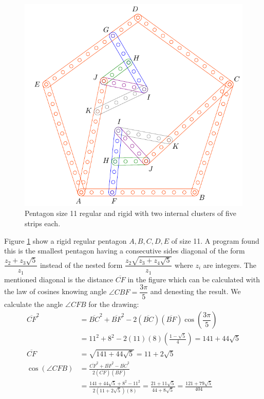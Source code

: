 \documentclass[11pt]{article}
\begin{document}
\begin{figure}[h]
 \centering
 \includegraphics[scale=1]{11/penta11a}
 \caption{Pentagon size 11 regular and rigid with two internal clusters of five strips each.}
 \label{fig:penta11a}
\end{figure}

Figure \ref{fig:penta11a} show a rigid regular pentagon $A,B,C,D,E$ of size 11. A program found this is the smallest pentagon having a consecutive sides diagonal of the form $\dfrac{z_2 + z_3\sqrt5}{z_1}$ instead of the nested form $\dfrac{z_2\sqrt{z_3+z_4\sqrt5}}{z_1}$ where $z_i$ are integers. The mentioned diagonal is the distance $\overline{CF}$ in the figure which can be calculated with the law of cosines knowing angle $\angle{CBF} = \dfrac{3\pi}5$ and denesting the result. We calculate the angle $\angle{CFB}$ for the drawing:
\begin{align}
\overline{CF}^2 &= \overline{BC}^2 + \overline{BF}^2 
 - 2(\overline{BC})(\overline{BF})\cos\left(\dfrac{3\pi}5\right)\\
 &= 11^2 + 8^2 - 2(11)(8)\left(\frac{1-\sqrt5}4\right) = 141 + 44\sqrt5\nonumber\\
\overline{CF} &= \sqrt{141 + 44\sqrt5} = 11 + 2\sqrt5\\
\cos(\angle{CFB}) &= \frac{\overline{CF}^2 + \overline{BF}^2 - \overline{BC}^2}
 {2(\overline{CF})(\overline{BF})}\nonumber\\
 &= \frac{141+44\sqrt5 + 8^2 - 11^2}{2(11+2\sqrt5)(8)}
  = \frac{21+11\sqrt5}{44+8\sqrt5} = \frac{121+79\sqrt5}{404}
\end{align}
\end{document}
